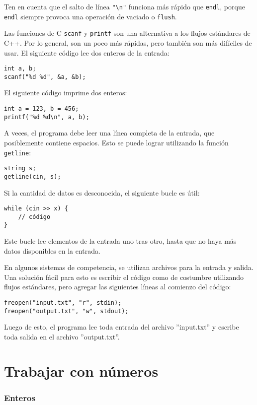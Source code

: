 Ten en cuenta que el salto de línea \texttt{"\textbackslash n"}
funciona más rápido que \texttt{endl},
porque \texttt{endl} siempre provoca
una operación de vaciado o \texttt{flush}.

Las funciones de C \texttt{scanf}
y \texttt{printf} son una alternativa
a los flujos estándares de C++.
Por lo general, son un poco más rápidas,
pero también son más difíciles de usar.
El siguiente código lee dos enteros de la entrada:
\begin{lstlisting}
int a, b;
scanf("%d %d", &a, &b);
\end{lstlisting}
El siguiente código imprime dos enteros:
\begin{lstlisting}
int a = 123, b = 456;
printf("%d %d\n", a, b);
\end{lstlisting}
A veces, el programa debe leer una línea completa
de la entrada, que posiblemente contiene espacios.
Esto se puede lograr utilizando la
función \texttt{getline}:

\begin{lstlisting}
string s;
getline(cin, s);
\end{lstlisting}

Si la cantidad de datos es desconocida, el siguiente
bucle es útil:
\begin{lstlisting}
while (cin >> x) {
    // código
}
\end{lstlisting}
Este bucle lee elementos de la entrada
uno tras otro, hasta que no haya
más datos disponibles en la entrada.

En algunos sistemas de competencia, se utilizan archivos para
la entrada y salida.
Una solución fácil para esto es escribir
el código como de costumbre utilizando flujos estándares,
pero agregar las siguientes líneas al comienzo del código:
\begin{lstlisting}
freopen("input.txt", "r", stdin);
freopen("output.txt", "w", stdout);
\end{lstlisting}
Luego de esto, el programa lee toda entrada del archivo
''input.txt'' y escribe toda salida en el archivo
''output.txt''.

\section{Trabajar con números}

\subsubsection{Enteros}

